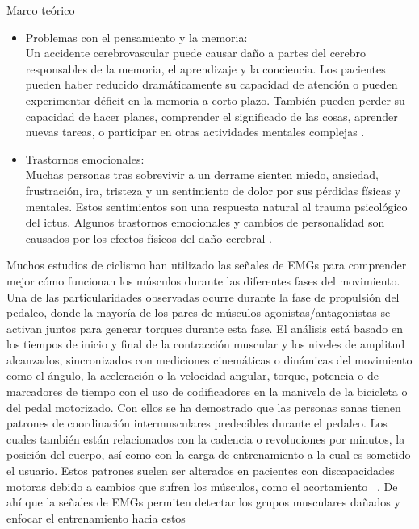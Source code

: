 \begin{thesischapter}{1} {Marco teórico}
\begin{itemize}
        \item Problemas con el pensamiento y la memoria: \\
        Un accidente cerebrovascular puede causar daño a partes del cerebro responsables de la memoria, el aprendizaje y la conciencia. Los pacientes pueden haber reducido dramáticamente su capacidad de atención o pueden experimentar déficit en la memoria a corto plazo. También pueden perder su capacidad de hacer planes, comprender el significado de las cosas, aprender nuevas tareas, o participar en otras actividades mentales complejas \cite{post-strok}.
        
        \item Trastornos emocionales: \\
        Muchas personas tras sobrevivir a un derrame sienten miedo, ansiedad, frustración, ira, tristeza y un sentimiento de dolor por sus pérdidas físicas y mentales. Estos sentimientos son una respuesta natural al trauma psicológico del ictus. Algunos trastornos emocionales y cambios de personalidad son causados por los efectos físicos del daño cerebral \cite{post-strok}.
    \end{itemize}

    \vspace{10pt}
    Muchos estudios de ciclismo han utilizado las señales de EMGs para comprender mejor cómo funcionan los músculos durante las diferentes fases del movimiento. Una de las particularidades observadas ocurre durante la fase de propulsión del pedaleo, donde la mayoría de los pares de músculos agonistas/antagonistas se activan juntos para generar torques durante esta fase. El análisis está basado en los tiempos de inicio y final de la contracción muscular y los niveles de amplitud alcanzados, sincronizados con mediciones cinemáticas o dinámicas del movimiento como el ángulo, la aceleración o la velocidad angular, torque, potencia o de marcadores de tiempo con el uso de codificadores en la manivela de la bicicleta o del pedal motorizado. Con ellos se ha demostrado que las personas sanas tienen patrones de coordinación intermusculares predecibles durante el pedaleo. Los cuales también están relacionados con la cadencia o revoluciones por minutos, la posición del cuerpo, así como con la carga de entrenamiento a la cual es sometido el usuario. Estos patrones suelen ser alterados en pacientes con discapacidades motoras debido a cambios que sufren los músculos, como el acortamiento ~\cite{johnston2007biomechanical}. De ahí que la señales de EMGs permiten detectar los grupos musculares dañados y enfocar el entrenamiento hacia estos ~\cite{hug2009electromyographic, kautz1998relationships}


\end{thesischapter}
